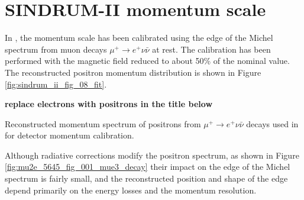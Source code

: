 \newpage
\section {SINDRUM-II momentum scale }

In \cite{sindrum_ii:Bertl2006}, the momentum scale has been calibrated using
the edge of the Michel spectrum from muon decays $\mu^+ \rightarrow e^+ \nu \bar{\nu}$
at rest. The calibration has been performed with the magnetic field reduced to about 50\%
of the nominal value. The reconstructed positron momentum distribution is shown
in Figure \ref{fig:sindrum_ii_fig_08_fit}.

{\bf replace electrons with positrons in the title below}

\vspace{0.1in}
 {
  \label{fig:sindrum_ii_fig_08_fit}
  Reconstructed momentum spectrum of positrons from $\mu^+ \rightarrow e^+ \nu \bar{\nu}$
  decays used in \cite{sindrum_ii:Bertl2006} for detector momentum calibration.
}
\vspace{0.1in}

Although radiative corrections modify the positron spectrum, as shown in Figure \ref{fig:mu2e_5645_fig_001_mue3_decay} their impact on the edge of the Michel spectrum
is fairly small, and the reconstructed position and shape of the edge depend primarily
on the energy losses and the momentum resolution.

